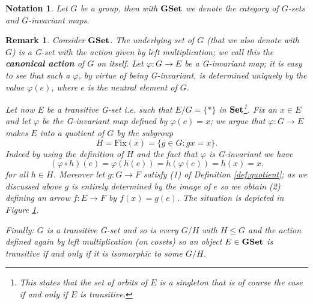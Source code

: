 \documentclass[italian, 12pt, reqno]{article}
\theoremstyle{myteo}
\newtheorem{remark}[theorem]{Remark}
\newtheorem{notation}[theorem]{Notation}
\numberwithin{equation}{section}
\newcommand{\gset}{\text{\textbf{GSet}}}
\newcommand{\set}{\text{\textbf{Set}}}
\newcommand{\fix}[1]{\text{Fix}(#1)}
\newcommand{\fun}[3]{#1\colon#2\to #3}
\begin{document}
\begin{notation}
  Let \(G\) be a group, then with \(\gset\) we denote the category of \(G\)-sets and \(G\)-invariant maps.
\end{notation}

\begin{remark}
  \label{rem:transitive_actions}
  Consider \(\gset\).
  The underlying set of \(G\) (that we also denote with \(G\)) is a G-set with the action given by left multiplication; we call this the \textbf{canonical action} of \(G\) on itself.
  Let \(\fun{\varphi}{G}{E}\) be a G-invariant map; it is easy to see that such a \(\varphi\), by virtue of being G-invariant, is determined uniquely by the value \(\varphi(e)\), where \(e\) is the neutral element of \(G\).

  Let now \(E\) be a transitive G-set i.e. such that \(E/G = \{*\}\) in \(\set\)\footnote{This states that the set of orbits of \(E\) is a singleton that is of course the case if and only if \(E\) is transitive.}.
  Fix an \(x\in E\) and let \(\varphi\) be the G-invariant map defined by \(\varphi(e) = x\); we argue that \(\fun{\varphi}{G}{E}\) makes \(E\) into a quotient of \(G\) by the subgroup
  \[H = \fix{x} = \{g\in G\colon gx = x\}.\]
  Indeed by using the definition of \(H\) and the fact that \(\varphi\) is G-invariant we have
  \[(\varphi\circ h)(e) = \varphi(h(e)) = h(\varphi(e)) = h(x) = x.\]
  for all \(h\in H\).
  Moreover let \(\fun{g}{G}{F}\) satisfy (1) of Definition \ref{def:quotient}; as we discussed above \(g\) is entirely determined by the image of \(e\) so we obtain (2) defining an arrow \(\fun{f}{E}{F}\) by \(f(x) = g(e)\).
  The situation is depicted in Figure \ref{diagram:transitive_actions}.

  Finally: \(G\) is a transitive G-set and so is every \(G/H\) with \(H\leq G\) and the action defined again by left multiplication (on cosets) so an object \(E\in\gset\) is transitive if and only if it is isomorphic to some \(G/H\).
\end{remark}

\begin{figure}
  \begin{center}
  \end{center}
  \caption{}
  \label{diagram:transitive_actions}
\end{figure}
\end{document}
